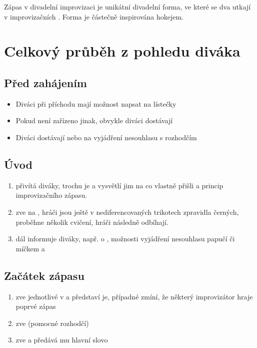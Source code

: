 \needspace{5cm} \label{zápas} Zápas v divadelní improvizaci je unikátní divadelní forma, ve které se dva  utkají v improvizačních .  
Forma je částečně inspirována hokejem. 
 
\section{ Celkový průběh z pohledu diváka }  
\subsection{ Před zahájením } \begin{itemize}
\item  Diváci při příchodu mají možnost napsat na lístečky 
\item  Pokud není zařízeno jinak, obvykle diváci dostávají 
\item  Diváci dostávají  nebo  na vyjádření nesouhlasu s rozhodčím
\end{itemize}
 
\subsection{ Úvod }   
\begin{enumerate}
\item  přivítá diváky, trochu je  a vysvětlí jim na co vlastně přišli a princip improvizačního zápasu.
\item  zve  na , hráči jsou ještě v nediferencovaných trikotech zpravidla černých, proběhne několik cvičení, hráči následně odbíhají.
\item  dál informuje diváky, např. o , možnosti vyjádření nesouhlasu papučí či míčkem a 
\end{enumerate}
 
\subsection{ Začátek zápasu }   
\begin{enumerate}
\item  zve jednotlivé  v  a představí je, případné zmíní, že některý improvizátor hraje poprvé zápas
\item  zve  (pomocné rozhodčí)
\item  zve  a předává mu hlavní slovo
\end{enumerate}
 
